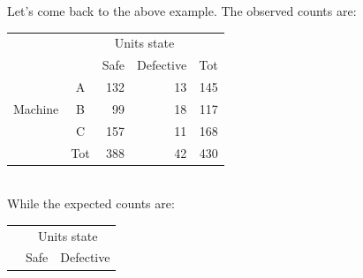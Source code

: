 \begin{frame}
  \begin{footnotesize}
    Let's come back to the above example. The observed counts are:\\
    \vspace*{.2cm}
    \hspace*{2cm}
    \begin{tabular}{|c|c|r|r|r|}
      \cline{3-4}
      \multicolumn{2}{c}{} & \multicolumn{2}{|c|}{Units state} & \multicolumn{1}{c}{}\\ \cline{3-5}
      \multicolumn{2}{c}{} & \multicolumn{1}{|c|}{\hspace*{.25cm}Safe\hspace*{.25cm}} & \multicolumn{1}{|c|}{Defective} & \multicolumn{1}{c|}{\hspace*{.25cm}Tot \hspace*{.25cm}}\\ \hline
      & \multicolumn{1}{|c|}{\hspace*{.5cm}A\hspace*{.5cm}} & \multicolumn{1}{|r|}{132} & \multicolumn{1}{|r|}{13} & \multicolumn{1}{|r|}{145}\\ \cline{2-5}
      \multicolumn{1}{|c|}{Machine} & \multicolumn{1}{|c|}{B} & \multicolumn{1}{|r|}{99} & \multicolumn{1}{|r|}{18} & \multicolumn{1}{|r|}{117}\\ \cline{2-5}
      & \multicolumn{1}{|c|}{C} & \multicolumn{1}{|r|}{157} & \multicolumn{1}{|r|}{11} & \multicolumn{1}{|r|}{168}\\ \hline
      \multicolumn{1}{c}{} & \multicolumn{1}{|c|}{Tot} & \multicolumn{1}{|r|}{388} & \multicolumn{1}{|r|}{42} & \multicolumn{1}{|r|}{430}\\ \cline{2-5}
    \end{tabular}\\
    \vspace*{.4cm}
    While the expected counts are:\\
    \vspace*{.2cm}
    \hspace*{2cm}
    \begin{tabular}{|c|c|r|r|}
      \cline{3-4}
      \multicolumn{2}{c}{} & \multicolumn{2}{|c|}{Units state}\\ \cline{3-4}
      \multicolumn{2}{c}{} & \multicolumn{1}{|c|}{\hspace*{.25cm}Safe\hspace*{.25cm}} & \multicolumn{1}{|c|}{Defective}\\ \hline

\end{tabular}
\end{footnotesize}
\end{frame}

